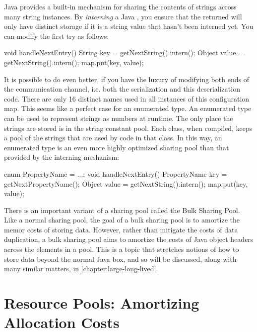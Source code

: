 Java provides a built-in mechanism for sharing the contents of strings across
many string instances. By \emph{interning} a Java
, you ensure that the returned  will only have
distinct storage if it is a string value that hasn't been interned yet. You can
modify the first try as follows:

\begin{shortlisting}
void handleNextEntry() {
	String key = getNextString().intern();
	Object value = getNextString().intern();
	map.put(key, value);
}
\end{shortlisting} 

It is possible to do even better, if you have the luxury of modifying both ends
of the communication channel, i.e. both the serialization and this
deserialization code. There are only 16 distinct names used in all instances of
this configuration map. This seems like a perfect case for an enumerated type.
An enumerated type can be used to represent strings as numbers at runtime. The
only place the strings are stored is in the string constant pool. Each class, when compiled, keeps a pool of the strings that
are used by code in that class. In this way, an enumerated type is an even more
highly optimized sharing pool than that provided by the interning mechanism:

\begin{shortlisting}
enum PropertyName = {...};
void handleNextEntry() {
	PropertyName key = getNextPropertyName();
	Object value = getNextString().intern();
	map.put(key, value);
}
\end{shortlisting} 

There is an important variant of a sharing pool called the Bulk Sharing Pool.
Like a normal sharing pool, the goal of a bulk sharing pool is to amortize the
memor costs of storing data. However, rather than mitigate the costs of data
duplication, a bulk sharing pool aims to amortize the costs of Java object
headers across the elements in a pool. This is a topic that stretches notions of
how to store data beyond the normal Java box, and so will be discussed, along
with many similar matters, in \autoref{chapter:large-long-lived}.

\section{Resource Pools: Amortizing Allocation Costs}
\label{sec:resource-pools}

